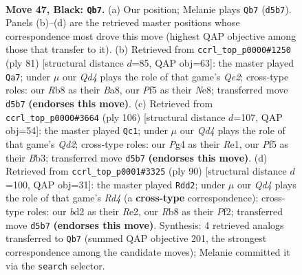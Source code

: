 \documentclass[11pt]{article}
\begin{document}
\clearpage

\begin{figure}[p]\centering
\begin{subfigure}{0.46\textwidth}\centering
\resizebox{\linewidth}{!}{%
\newchessgame
\chessboard[
  setfen={nr4k1/4b1n1/p4r2/P1pq1p1p/3p1Pp1/1P4P1/1RNBP2P/RQ1N2K1 b - - 11 47},
  showmover=false,
  pgfstyle=straightmove, color=movearrow, markmove={d5-b7}
]}
\caption{}
\end{subfigure}\hfill
\begin{subfigure}{0.46\textwidth}\centering
\resizebox{\linewidth}{!}{%
\newchessgame
\chessboard[
  setfen={b1r1n1k1/4qpp1/rp1pp2p/8/1PPNPP2/5B1P/1Q4P1/2RR3K b - - 28 41},
  showmover=false,
  pgfstyle=straightmove, color=movearrow, markmove={e7-a7}
]}
\caption{}
\end{subfigure}
\\[4pt]
\begin{subfigure}{0.46\textwidth}\centering
\resizebox{\linewidth}{!}{%
\newchessgame
\chessboard[
  setfen={2r3k1/3rqp2/1pbpn1p1/7p/1PP1Pp1P/1B1R1N2/3Q1PP1/4R1K1 w - - 37 54},
  showmover=false,
  pgfstyle=straightmove, color=movearrow, markmove={d2-c1}
]}
\caption{}
\end{subfigure}\hfill
\begin{subfigure}{0.46\textwidth}\centering
\resizebox{\linewidth}{!}{%
\newchessgame
\chessboard[
  setfen={2r2r1k/5q1p/3p1p2/1p1PnPp1/p1pR4/P1Q3NP/1P2RPP1/6K1 w - - 41 46},
  showmover=false,
  pgfstyle=straightmove, color=movearrow, markmove={d4-d2}
]}
\caption{}
\end{subfigure}
\caption{\textbf{Move 47, Black: \texttt{Qb7}.} (a) Our position; Melanie plays \texttt{Qb7} (\texttt{d5b7}). Panels (b)--(d) are the retrieved master positions whose correspondence most drove this move (highest QAP objective among those that transfer to it). (b) Retrieved from \texttt{ccrl\_top\_p0000\#1250} (ply 81) [structural distance $d$=85, QAP obj=63]: the master played \texttt{Qa7}; under $\mu$ our \emph{Qd4} plays the role of that game's \emph{Qe2}; cross-type roles: our \emph{R}b8 as their \emph{B}a8, our \emph{P}f5 as their \emph{N}e8; transferred move \texttt{d5b7} \textbf{(endorses this move)}. (c) Retrieved from \texttt{ccrl\_top\_p0000\#3664} (ply 106) [structural distance $d$=107, QAP obj=54]: the master played \texttt{Qc1}; under $\mu$ our \emph{Qd4} plays the role of that game's \emph{Qd2}; cross-type roles: our \emph{P}g4 as their \emph{R}e1, our \emph{P}f5 as their \emph{B}b3; transferred move \texttt{d5b7} \textbf{(endorses this move)}. (d) Retrieved from \texttt{ccrl\_top\_p0001\#3325} (ply 90) [structural distance $d$=100, QAP obj=31]: the master played \texttt{Rdd2}; under $\mu$ our \emph{Qd4} plays the role of that game's \emph{Rd4} (a \textbf{cross-type} correspondence); cross-type roles: our \emph{b}d2 as their \emph{R}e2, our \emph{R}b8 as their \emph{P}f2; transferred move \texttt{d5b7} \textbf{(endorses this move)}. Synthesis: 4 retrieved analogs transferred to \texttt{Qb7} (summed QAP objective 201, the strongest correspondence among the candidate moves); Melanie committed it via the \texttt{search} selector.}
\label{fig:thought-m93}
\end{figure}
\end{document}
